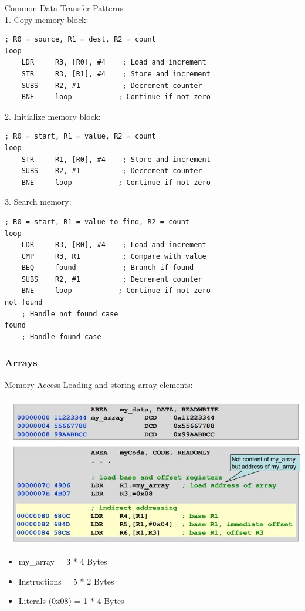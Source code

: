 \begin{KR}{Common Data Transfer Patterns}\\
1. Copy memory block:
\begin{lstlisting}[language=armasm, style=basesmol]
    ; R0 = source, R1 = dest, R2 = count
loop
    LDR     R3, [R0], #4    ; Load and increment
    STR     R3, [R1], #4    ; Store and increment
    SUBS    R2, #1          ; Decrement counter
    BNE     loop           ; Continue if not zero
\end{lstlisting}

2. Initialize memory block:
\begin{lstlisting}[language=armasm, style=basesmol]
    ; R0 = start, R1 = value, R2 = count
loop
    STR     R1, [R0], #4    ; Store and increment
    SUBS    R2, #1          ; Decrement counter
    BNE     loop           ; Continue if not zero
\end{lstlisting}

3. Search memory:
\begin{lstlisting}[language=armasm, style=basesmol]
    ; R0 = start, R1 = value to find, R2 = count
loop
    LDR     R3, [R0], #4    ; Load and increment
    CMP     R3, R1          ; Compare with value
    BEQ     found           ; Branch if found
    SUBS    R2, #1          ; Decrement counter
    BNE     loop           ; Continue if not zero
not_found
    ; Handle not found case
found
    ; Handle found case
\end{lstlisting}
\end{KR}

\columnbreak

\subsubsection{Arrays}

\begin{concept}{Memory Access}
Loading and storing array elements:

\includegraphics[width=\linewidth]{images/2024_12_29_79e6b22f503fb7b4f718g-03(1)}

\begin{itemize}
  \item my\_array = 3 * 4 Bytes
  \item Instructions = 5 * 2 Bytes
  \item Literals (0x08) = 1 * 4 Bytes
\end{itemize}
\end{concept}


